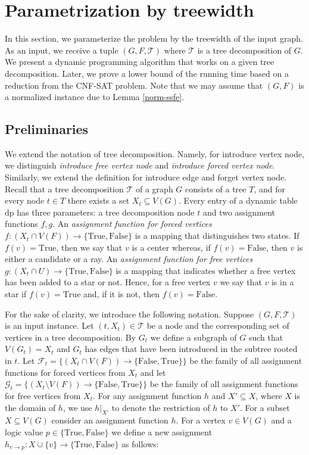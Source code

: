 \documentclass[en]{pracamgr}
\theoremstyle{definition}
\newcommand{\cnfsat}{{\sc CNF-SAT}}
\newcommand{\true}{\textrm{True}}
\newcommand{\false}{\textrm{False}}
\begin{document}
\section{Parametrization by treewidth}

In this section, we parameterize the problem by the treewidth of the input graph. As an input, we receive a tuple $(G,F,\mathcal{T})$ where $\mathcal{T}$ is a tree decomposition of $G$. We present a dynamic programming algorithm that works on a given tree decomposition. Later, we prove a lower bound of the running time based on a reduction from the \cnfsat{} problem. Note that we may assume that $(G,F)$ is a normalized instance due to Lemma \ref{norm-ssfe}.

\subsection{Preliminaries}

We extend the notation of tree decomposition. Namely, for introduce vertex node, we distinguish \textit{introduce free vertex node} and \textit{introduce forced vertex node}. Similarly, we extend the definition for introduce edge and forget vertex node. Recall that a tree decomposition $\mathcal{T}$ of a graph $G$ consists of a tree $T$, and for every node $t \in T$ there exists a set $X_t \subseteq V(G)$. Every entry of a dynamic table $\text{dp}$ has three parameters: a tree decomposition node $t$ and two assignment functions $f,g$. An \textit{assignment function for forced vertices} $f: (X_t \cap V(F)) \rightarrow \{\true, \false\}$ is a mapping that distinguishes two states. If $f(v)=\true$, then we say that $v$ is a center whereas, if $f(v)=\false$, then $v$ is either a candidate or a ray. An \textit{assignment function for free vertices} $g: (X_t \cap U) \rightarrow \{\true, \false\}$ is a mapping that indicates whether a free vertex has been added to a star or not. Hence, for a free vertex $v$ we say that $v$ is in a star if $f(v)=\true$ and, if it is not, then $f(v)=\false$.

For the sake of clarity, we introduce the following notation. Suppose $(G,F,\mathcal{T})$ is an input instance. Let $(t,X_t) \in \mathcal{T}$ be a node and the corresponding set of vertices in a tree decomposition. By $G_t$ we define a subgraph of $G$ such that $V(G_t) = X_t$ and $G_t$ has edges that have been introduced in the subtree rooted in $t$. Let $\mathcal{F}_t = \{(X_t \cap V(F)) \rightarrow \{\false,\true\}\}$ be the family of all assignment functions for forced vertices from $X_t$ and let $\mathcal{G}_t = \{(X_t \setminus V(F)) \rightarrow \{\false,\true\}\}$ be the family of all assignment functions for free vertices from $X_t$. For any assignment function $h$ and $X' \subseteq X$, where $X$ is the domain of $h$, we use $h|_{X'}$ to denote the restriction of $h$ to $X'$. For a subset $X \subseteq V(G)$ consider an assignment function $h$. For a vertex $v \in V(G)$ and a logic value $p \in \{\true, \false\}$ we define a new assignment $h_{v \rightarrow p}: X \cup \{v\} \rightarrow \{\true, \false\}$ as follows:
\end{document}
